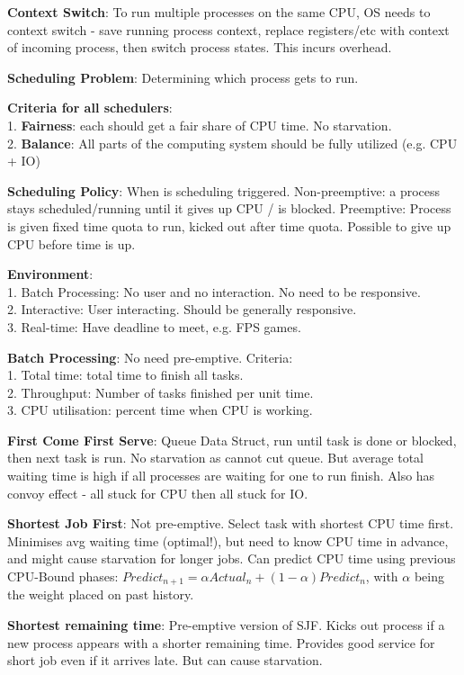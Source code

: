 \documentclass[a4paper,landscape]{article}
\newcommand{\rnname}[1]{\textbf{#1}}
\begin{document}
\begin{multicols*}{4}
\begin{flatitemize}
\item \rnname{Context Switch}: To run multiple processes on the same CPU, OS needs to context switch - save running process context, replace registers/etc with context of incoming process, then switch process states. This incurs overhead.
\item \rnname{Scheduling Problem}: Determining which process gets to run.
\item \rnname{Criteria for all schedulers}: \\
1. \textbf{Fairness}: each should get a fair share of CPU time. No starvation. \\
2. \textbf{Balance}: All parts of the computing system should be fully utilized (e.g. CPU + IO)
\item \rnname{Scheduling Policy}: When is scheduling triggered. Non-preemptive: a process stays scheduled/running until it gives up CPU / is blocked. Preemptive: Process is given fixed time quota to run, kicked out after time quota. Possible to give up CPU before time is up.
\item \rnname{Environment}: \\
1. Batch Processing: No user and no interaction. No need to be responsive.\\
2. Interactive: User interacting. Should be generally responsive. \\
3. Real-time: Have deadline to meet, e.g. FPS games.
\item \rnname{Batch Processing}: No need pre-emptive. Criteria:\\
1. Total time: total time to finish all tasks. \\
2. Throughput: Number of tasks finished per unit time. \\
3. CPU utilisation: percent time when CPU is working.

\item \rnname{First Come First Serve}: Queue Data Struct, run until task is done or blocked, then next task is run. No starvation as cannot cut queue. But average total waiting time is high if all processes are waiting for one to run finish. Also has convoy effect - all stuck for CPU then all stuck for IO.
\item \rnname{Shortest Job First}: Not pre-emptive. Select task with shortest CPU time first. Minimises avg waiting time (optimal!), but need to know CPU time in advance, and might cause starvation for longer jobs. Can predict CPU time using previous CPU-Bound phases: $Predict_{n+1} = \alpha Actual_{n} + (1-\alpha)Predict_{n}$, with $\alpha$ being the weight placed on past history.
\item \rnname{Shortest remaining time}: Pre-emptive version of SJF. Kicks out process if a new process appears with a shorter remaining time. Provides good service for short job even if it arrives late. But can cause starvation.


\end{flatitemize}
\end{multicols*}
\end{document}
